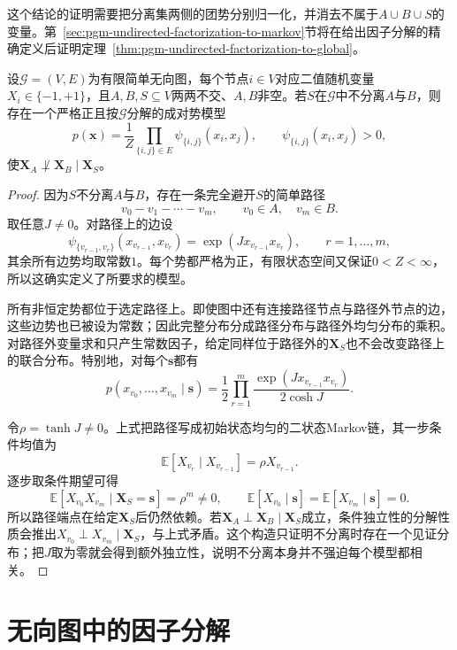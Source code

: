 这个结论的证明需要把分离集两侧的团势分别归一化，并消去不属于$A\cup B\cup S$的变量。第~\ref{sec:pgm-undirected-factorization-to-markov}节将在给出因子分解的精确定义后证明定理~\ref{thm:pgm-undirected-factorization-to-global}。

\begin{theorem}[严格正二值成对势模型类中的分离完备性]
  \label{thm:pgm-undirected-separation-completeness}
  设$\mathcal{G}=(V,E)$为有限简单无向图，每个节点$i\in V$对应二值随机变量$X_i\in\{-1,+1\}$，且$A,B,S\subseteq V$两两不交、$A,B$非空。若$S$在$\mathcal{G}$中不分离$A$与$B$，则存在一个严格正且按$\mathcal{G}$分解的成对势模型
  \[
    p(\bm{x})=\frac{1}{Z}
      \prod_{\{i,j\}\in E}\psi_{\{i,j\}}(x_i,x_j),
    \qquad \psi_{\{i,j\}}(x_i,x_j)>0,
  \]
  使$\bm{X}_A\not\perp\bm{X}_B\mid\bm{X}_S$。
\end{theorem}

\begin{proof}
因为$S$不分离$A$与$B$，存在一条完全避开$S$的简单路径
\[
  v_0-v_1-\cdots-v_m,
  \qquad v_0\in A,\quad v_m\in B.
\]
取任意$J\neq0$。对路径上的边设
\[
  \psi_{\{v_{r-1},v_r\}}(x_{v_{r-1}},x_{v_r})
  =\exp(Jx_{v_{r-1}}x_{v_r}),
  \qquad r=1,\ldots,m,
\]
其余所有边势均取常数$1$。每个势都严格为正，有限状态空间又保证$0<Z<\infty$，所以这确实定义了所要求的模型。

所有非恒定势都位于选定路径上。即使图中还有连接路径节点与路径外节点的边，这些边势也已被设为常数；因此完整分布分成路径分布与路径外均匀分布的乘积。对路径外变量求和只产生常数因子，给定同样位于路径外的$\bm{X}_S$也不会改变路径上的联合分布。特别地，对每个$\bm{s}$都有
\[
  p(x_{v_0},\ldots,x_{v_m}\mid\bm{s})
  =\frac12\prod_{r=1}^{m}
    \frac{\exp(Jx_{v_{r-1}}x_{v_r})}{2\cosh J}.
\]

令$\rho=\tanh J\neq0$。上式把路径写成初始状态均匀的二状态Markov链，其一步条件均值为
\[
  \mathbb{E}[X_{v_r}\mid X_{v_{r-1}}]
  =\rho X_{v_{r-1}}.
\]
逐步取条件期望可得
\[
  \mathbb{E}[X_{v_0}X_{v_m}\mid\bm{X}_S=\bm{s}]
  =\rho^m\neq0,
  \qquad
  \mathbb{E}[X_{v_0}\mid\bm{s}]
  =\mathbb{E}[X_{v_m}\mid\bm{s}]=0.
\]
所以路径端点在给定$\bm{X}_S$后仍然依赖。若$\bm{X}_A\perp\bm{X}_B\mid\bm{X}_S$成立，条件独立性的分解性质会推出$X_{v_0}\perp X_{v_m}\mid\bm{X}_S$，与上式矛盾。这个构造只证明不分离时存在一个见证分布；把$J$取为零就会得到额外独立性，说明不分离本身并不强迫每个模型都相关。
\end{proof}

\section{无向图中的因子分解}
\label{sec:pgm-undirected-factorization}

